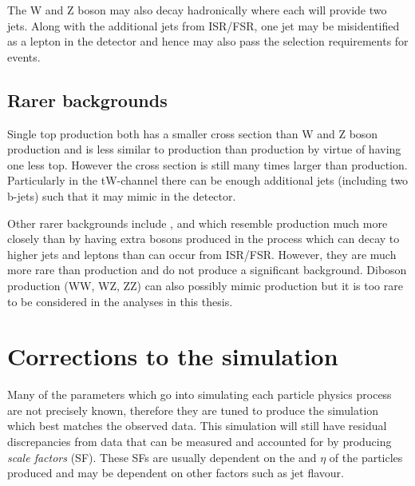 The W and Z boson may also decay hadronically where each will provide two jets. Along with the additional jets from ISR/FSR, one jet may be misidentified as a lepton in the detector and hence may also pass the selection requirements for \tttt events.

\subsection{Rarer backgrounds}
Single top production both has a smaller cross section than W and Z boson production and is less similar to \tttt production than \ttbar production by virtue of having one less top. However the cross section is still many times larger than \tttt production. Particularly in the tW-channel there can be enough additional jets (including two b-jets) such that it may mimic \tttt in the detector.


Other rarer backgrounds include \ttH, \ttZ and \ttW which resemble \tttt production much more closely than \ttbar by having extra bosons produced in the process which can decay to higher \pt jets and leptons than can occur from ISR/FSR. However, they are much more rare than \ttbar production and do not produce a significant background. Diboson production (WW, WZ, ZZ) can also possibly mimic \tttt production but it is too rare to be considered in the analyses in this thesis.


\section{Corrections to the simulation}
\label{sec:Calibrations}
Many of the parameters which go into simulating each particle physics process are not precisely known, therefore they are tuned to produce the simulation which best matches the observed data. This simulation will still have residual discrepancies from data that can be measured and accounted for by producing \emph{scale factors} (SF). These SFs are usually dependent on the \pt and $\eta$ of the particles produced and may be dependent on other factors such as jet flavour. 

